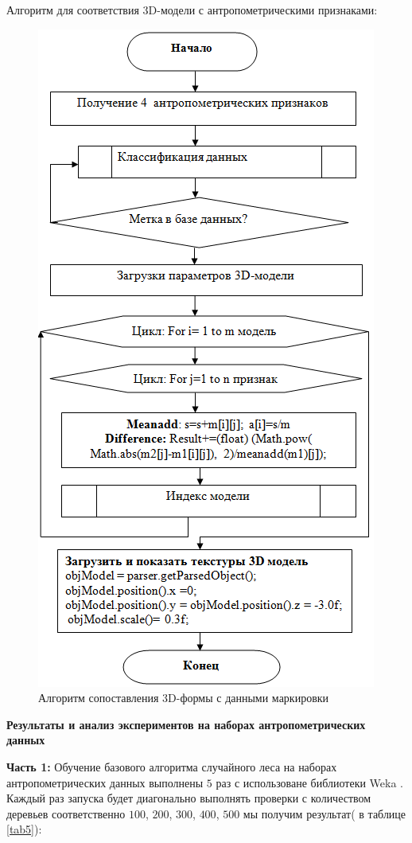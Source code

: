 Алгоритм для соответствия 3D-модели с антропометрическими признаками:
\begin{figure}[ht!]
\centering
\includegraphics [scale=1] {images/h21.png}
\begin{center}
\caption{Алгоритм сопоставления 3D-формы с данными маркировки} \label{img21}
\end{center}
\end{figure}

\textbf{Результаты и анализ экспериментов на наборах антропометрических данных}

\textbf{Часть 1:} Обучение базового алгоритма случайного леса на наборах антропометрических данных выполнены $5$ раз с использоване библиотеки Weka \cite{Weka}. Каждый раз запуска будет диагонально выполнять проверки с количеством деревьев соответственно $100$, $200$, $300$, $400$, $500$ мы получим результат( в таблице \ref{tab5}):


